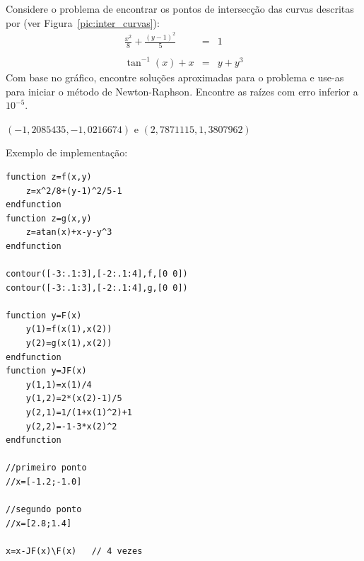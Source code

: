 \begin{exer}  Considere o problema de encontrar os pontos de intersecção das curvas descritas por (ver Figura~\ref{pic:inter_curvas}):
\begin{eqnarray*}
\frac{x^2}{8}+\frac{(y-1)^2}{5}&=&1\\~\\
\tan^{-1}(x)+x&=&y+y^3
\end{eqnarray*}
 Com base no gráfico, encontre soluções aproximadas para o problema e use-as para iniciar o método de Newton-Raphson. Encontre as raízes com erro inferior a $10^{-5}$.
\end{exer}
\begin{resp}
$\left(-1,2085435, -1,0216674 \right)$ e $\left(2,7871115, 1,3807962\right)$

\ifisscilab
Exemplo de implementação:
\begin{verbatim}
function z=f(x,y)
    z=x^2/8+(y-1)^2/5-1
endfunction
function z=g(x,y)
    z=atan(x)+x-y-y^3
endfunction

contour([-3:.1:3],[-2:.1:4],f,[0 0])
contour([-3:.1:3],[-2:.1:4],g,[0 0])

function y=F(x)
    y(1)=f(x(1),x(2))
    y(2)=g(x(1),x(2))
endfunction
function y=JF(x)
    y(1,1)=x(1)/4
    y(1,2)=2*(x(2)-1)/5
    y(2,1)=1/(1+x(1)^2)+1
    y(2,2)=-1-3*x(2)^2
endfunction

//primeiro ponto
//x=[-1.2;-1.0]

//segundo ponto
//x=[2.8;1.4]

x=x-JF(x)\F(x)   // 4 vezes
\end{verbatim}
\fi
\end{resp}



